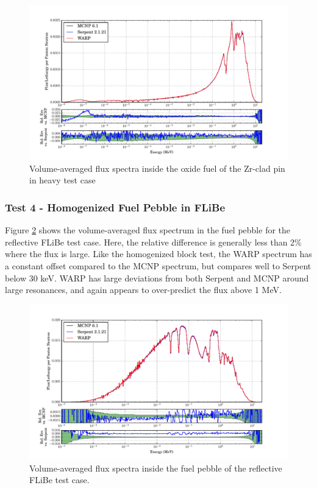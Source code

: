 \documentclass[preprint,12pt]{elsarticle}
\begin{document}
\begin{figure}[h!]
\centering
\includegraphics[width=\textwidth,trim= 1cm 0cm 1cm 0cm]{graphics/pincell_spec.pdf}
\caption{Volume-averaged flux spectra inside the oxide fuel of the Zr-clad pin in heavy test case \label{pincell_spec} }
\end{figure}

\newpage
\subsubsection{Test 4 - Homogenized Fuel Pebble in FLiBe}

Figure \ref{flibe_spec} shows the volume-averaged flux spectrum in the fuel pebble for the reflective FLiBe test case.  Here, the relative difference is generally less than 2\% where the flux is large.  Like the homogenized block test, the WARP spectrum has a constant offset compared to the MCNP spectrum, but compares well to Serpent below 30 keV. WARP has large deviations from both Serpent and MCNP around large resonances, and again appears to over-predict the flux above 1 MeV.


\begin{figure}[h!]
\centering
\includegraphics[width=\textwidth,trim= 1cm 0cm 1cm 0cm]{graphics/flibe_spec.pdf}
\caption{Volume-averaged flux spectra inside the fuel pebble of the reflective FLiBe test case. \label{flibe_spec} }
\end{figure}
\end{document}
